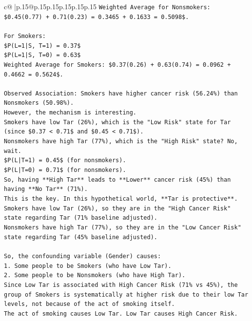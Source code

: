 \documentclass{article}
\begin{document}
{\begin{supertabular}{c@{$\;$}|p{.15\linewidth}@{}p{.15\linewidth}p{.15\linewidth}p{.15\linewidth}p{.15\linewidth}p{.15\linewidth}}
{{{\texttt{Weighted Average for Nonsmokers: \$0.45(0.77) + 0.71(0.23) = 0.3465 + 0.1633 = 0.5098\$.} \\
\\ 
\texttt{For Smokers:} \\
\texttt{\$P(L=1|S, T=1) = 0.37\$} \\
\texttt{\$P(L=1|S, T=0) = 0.63\$} \\
\texttt{Weighted Average for Smokers: \$0.37(0.26) + 0.63(0.74) = 0.0962 + 0.4662 = 0.5624\$.} \\
\\ 
\texttt{Observed Association: Smokers have higher cancer risk (56.24\%) than Nonsmokers (50.98\%).} \\
\texttt{However, the mechanism is interesting.} \\
\texttt{Smokers have low Tar (26\%), which is the "Low Risk" state for Tar (since \$0.37 < 0.71\$ and \$0.45 < 0.71\$).} \\
\texttt{Nonsmokers have high Tar (77\%), which is the "High Risk" state? No, wait.} \\
\texttt{\$P(L|T=1) = 0.45\$ (for nonsmokers).} \\
\texttt{\$P(L|T=0) = 0.71\$ (for nonsmokers).} \\
\texttt{So, having **High Tar** leads to **Lower** cancer risk (45\%) than having **No Tar** (71\%).} \\
\texttt{This is the key. In this hypothetical world, **Tar is protective**.} \\
\texttt{Smokers have low Tar (26\%), so they are in the "High Cancer Risk" state regarding Tar (71\% baseline adjusted).} \\
\texttt{Nonsmokers have high Tar (77\%), so they are in the "Low Cancer Risk" state regarding Tar (45\% baseline adjusted).} \\
\\ 
\texttt{So, the confounding variable (Gender) causes:} \\
\texttt{1.  Some people to be Smokers (who have Low Tar).} \\
\texttt{2.  Some people to be Nonsmokers (who have High Tar).} \\
\texttt{Since Low Tar is associated with High Cancer Risk (71\% vs 45\%), the group of Smokers is systematically at higher risk due to their low Tar levels, not because of the act of smoking itself.} \\
\texttt{The act of smoking causes Low Tar. Low Tar causes High Cancer Risk.} \\
}}}
\end{supertabular}}
\end{document}
